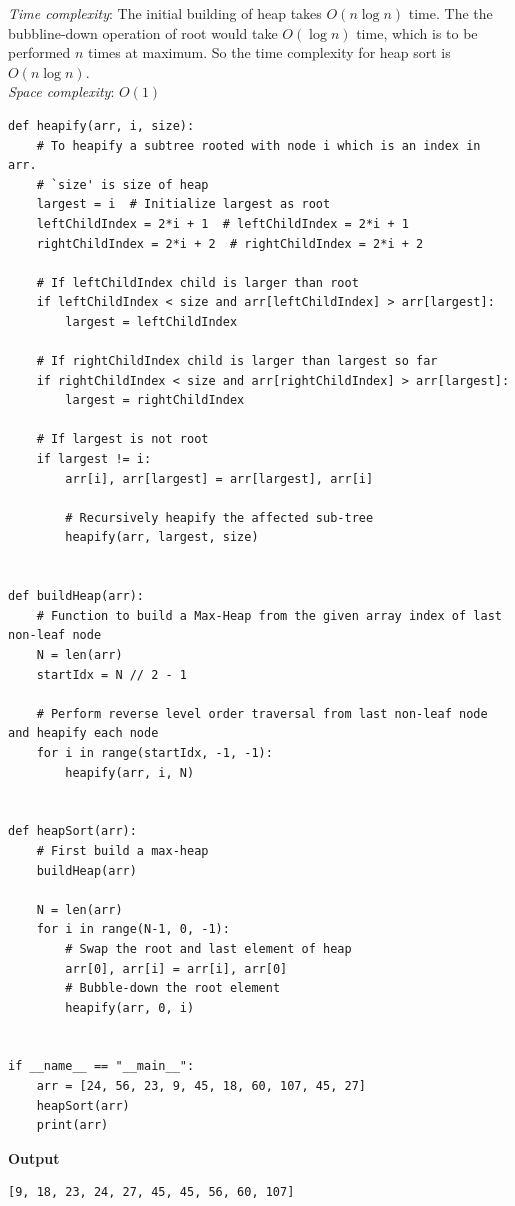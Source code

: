 \documentclass[a4paper,11pt]{book}
\begin{document}
\noindent \textit{Time complexity}: The initial building of heap takes $O(n\log n)$ time. The the bubbline-down operation of root would take $O(\log n)$ time, which is to be performed $n$ times at maximum. So the time complexity for heap sort is $O(n\log n)$.\\
\noindent \textit{Space complexity}: $O(1)$
\begin{lstlisting}
def heapify(arr, i, size):
    # To heapify a subtree rooted with node i which is an index in arr. 
    # `size' is size of heap
    largest = i  # Initialize largest as root
    leftChildIndex = 2*i + 1  # leftChildIndex = 2*i + 1
    rightChildIndex = 2*i + 2  # rightChildIndex = 2*i + 2
 
    # If leftChildIndex child is larger than root
    if leftChildIndex < size and arr[leftChildIndex] > arr[largest]:
        largest = leftChildIndex
 
    # If rightChildIndex child is larger than largest so far
    if rightChildIndex < size and arr[rightChildIndex] > arr[largest]:
        largest = rightChildIndex
 
    # If largest is not root
    if largest != i:
        arr[i], arr[largest] = arr[largest], arr[i]
 
        # Recursively heapify the affected sub-tree
        heapify(arr, largest, size)
 

def buildHeap(arr):
    # Function to build a Max-Heap from the given array index of last non-leaf node
    N = len(arr)
    startIdx = N // 2 - 1
 
    # Perform reverse level order traversal from last non-leaf node and heapify each node
    for i in range(startIdx, -1, -1):
        heapify(arr, i, N)


def heapSort(arr):
    # First build a max-heap
    buildHeap(arr)
    
    N = len(arr)
    for i in range(N-1, 0, -1):
        # Swap the root and last element of heap
        arr[0], arr[i] = arr[i], arr[0]
        # Bubble-down the root element
        heapify(arr, 0, i)


if __name__ == "__main__":
    arr = [24, 56, 23, 9, 45, 18, 60, 107, 45, 27]
    heapSort(arr)
    print(arr)
\end{lstlisting}
\textbf{Output}
\begin{lstlisting}
[9, 18, 23, 24, 27, 45, 45, 56, 60, 107]
\end{lstlisting}
\end{document}
